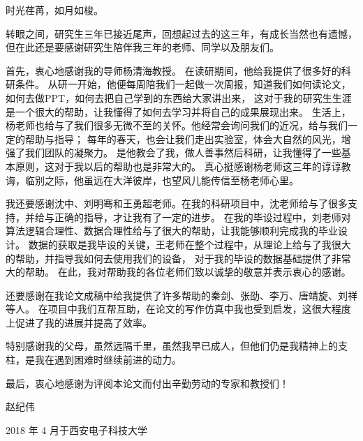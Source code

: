 
\begin{thanks}

时光荏苒，如月如梭。\par

转眼之间，研究生三年已接近尾声，回想起过去的这三年，有成长当然也有遗憾，
但在此还是要感谢研究生陪伴我三年的老师、同学以及朋友们。\par

首先，衷心地感谢我的导师杨清海教授。
在读研期间，他给我提供了很多好的科研条件。
从研一开始，他便每周陪我们一起做一次周报，知道我们如何读论文，如何去做PPT，如何去把自己学到的东西给大家讲出来，
这对于我的研究生生涯是一个很大的帮助，让我懂得了如何去学习并将自己的成果展现出来。
生活上，杨老师也给与了我们很多无微不至的关怀。他经常会询问我们的近况，给与我们一定的帮助与指导；
每年的春天，也会让我们走出实验室，体会大自然的风光，增强了我们团队的凝聚力。
是他教会了我，做人善事然后科研，让我懂得了一些基本原则，这对于我以后的帮助也是非常大的。
真心挺感谢杨老师这三年的谆谆教诲，临别之际，他虽远在大洋彼岸，也望风儿能传信至杨老师心里。\par

我还要感谢沈中、刘明骞和王勇超老师。在我的科研项目中，沈老师给与了很多支持，并给与正确的指导，才让我有了一定的进步。
在我的毕设过程中，刘老师对算法逻辑合理性、数据合理性给与了很大的帮助，让我能够顺利完成我的毕业设计。
数据的获取是我毕设的关键，王老师在整个过程中，从理论上给与了我很大的帮助，并指导我如何去使用我们的设备，
对于我的毕设的数据基础提供了非常大的帮助。
在此，我对帮助我的各位老师们致以诚挚的敬意并表示衷心的感谢。

还要感谢在我论文成稿中给我提供了许多帮助的秦剑、张劭、李万、唐靖旋、刘祥等人。
在项目中我们互帮互助，在论文的写作仿真中我也受到启发，这很大程度上促进了我的进展并提高了效率。 \par

特别感谢我的父母，虽然远隔千里，虽然我早已成人，但他们仍是我精神上的支柱，是我在遇到困难时继续前进的动力。\par

最后，衷心地感谢为评阅本论文而付出辛勤劳动的专家和教授们！ \par

赵纪伟\par

2018 年 4 月于西安电子科技大学\par

\end{thanks}
